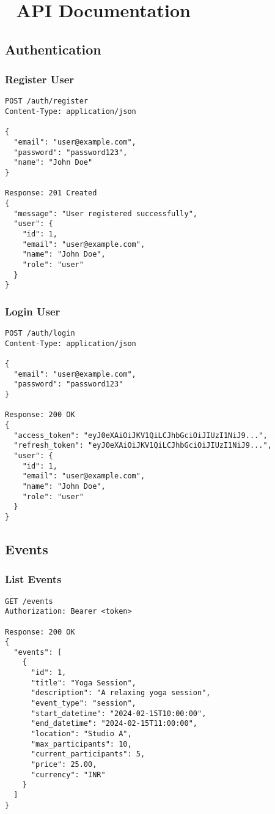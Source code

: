 \documentclass[12pt,a4paper]{article}
\begin{document}
\section{📖 API Documentation}

\subsection{Authentication}

\subsubsection{Register User}
\begin{lstlisting}[language=HTTP]
POST /auth/register
Content-Type: application/json

{
  "email": "user@example.com",
  "password": "password123",
  "name": "John Doe"
}

Response: 201 Created
{
  "message": "User registered successfully",
  "user": {
    "id": 1,
    "email": "user@example.com",
    "name": "John Doe",
    "role": "user"
  }
}
\end{lstlisting}

\subsubsection{Login User}
\begin{lstlisting}[language=HTTP]
POST /auth/login
Content-Type: application/json

{
  "email": "user@example.com",
  "password": "password123"
}

Response: 200 OK
{
  "access_token": "eyJ0eXAiOiJKV1QiLCJhbGciOiJIUzI1NiJ9...",
  "refresh_token": "eyJ0eXAiOiJKV1QiLCJhbGciOiJIUzI1NiJ9...",
  "user": {
    "id": 1,
    "email": "user@example.com",
    "name": "John Doe",
    "role": "user"
  }
}
\end{lstlisting}

\subsection{Events}

\subsubsection{List Events}
\begin{lstlisting}[language=HTTP]
GET /events
Authorization: Bearer <token>

Response: 200 OK
{
  "events": [
    {
      "id": 1,
      "title": "Yoga Session",
      "description": "A relaxing yoga session",
      "event_type": "session",
      "start_datetime": "2024-02-15T10:00:00",
      "end_datetime": "2024-02-15T11:00:00",
      "location": "Studio A",
      "max_participants": 10,
      "current_participants": 5,
      "price": 25.00,
      "currency": "INR"
    }
  ]
}
\end{lstlisting}
\end{document}
